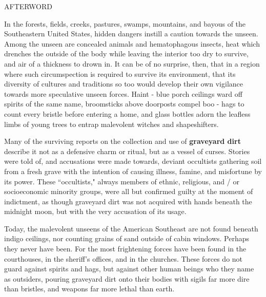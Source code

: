 \documentclass[12pt]{article}
\begin{document}
\vspace*{3\baselineskip}

\begin{center}
\huge AFTERWORD
\end{center}

\vspace*{2\baselineskip}

\begingroup
\hspace{10mm} In the forests, fields, creeks, pastures, swamps, mountains, and bayous of the Southeastern United States, hidden dangers instill a caution towards the unseen. Among the unseen are concealed animals and hematophagous insects, heat which drenches the outside of the body while leaving the interior too dry to survive, and air of a thickness to drown in. It can be of no surprise, then, that in a region where such circumspection is required to survive its environment, that its diversity of cultures and traditions so too would develop their own vigilance towards more speculative unseen forces. Haint - blue porch ceilings ward off spirits of the same name, broomsticks above doorposts compel boo - hags to count every bristle before entering a home, and glass bottles adorn the leafless limbs of young trees to entrap malevolent witches and shapeshifters. 
\endgroup

\begingroup
\hspace{10mm} Many of the surviving reports on the collection and use of \textbf{graveyard dirt} describe it not as a defensive charm or ritual, but as a vessel of curses. Stories were told of, and accusations were made towards, deviant occultists gathering soil from a fresh grave with the intention of causing illness, famine, and misfortune by its power. These ``occultists," always members of ethnic, religious, and / or socioeconomic minority groups, were all but confirmed guilty at the moment of indictment, as though graveyard dirt was not acquired with hands beneath the midnight moon, but with the very accusation of its usage.
\endgroup

\begingroup
\hspace{10mm} Today, the malevolent unseens of the American Southeast are not found beneath indigo ceilings, nor counting grains of sand outside of cabin windows. Perhaps they never have been. For the most frightening forces have been found in the courthouses, in the sheriff's offices, and in the churches. These forces do not guard against spirits and hags, but against other human beings who they name as outsiders, pouring graveyard dirt onto their bodies with sigils far more dire than bristles, and weapons far more lethal than earth. 
\endgroup
\end{document}
